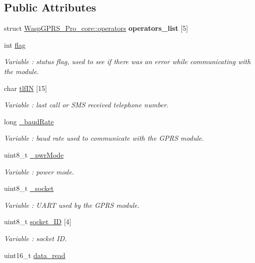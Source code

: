 \subsection*{Public Attributes}
\begin{DoxyCompactItemize}
\item 
struct \hyperlink{struct_wasp_g_p_r_s___pro__core_1_1operators}{Wasp\+G\+P\+R\+S\+\_\+\+Pro\+\_\+core\+::operators} {\bfseries operators\+\_\+list} \mbox{[}5\mbox{]}\hypertarget{class_wasp_g_p_r_s___pro__core_aeea2da99dc1753541bbfaded168fafad}{}\label{class_wasp_g_p_r_s___pro__core_aeea2da99dc1753541bbfaded168fafad}

\item 
int \hyperlink{class_wasp_g_p_r_s___pro__core_a39db9f922e8dca6aeef93010e42ae416}{flag}
\begin{DoxyCompactList}\small\item\em Variable \+: status flag, used to see if there was an error while communicating with the module. \end{DoxyCompactList}\item 
char \hyperlink{class_wasp_g_p_r_s___pro__core_a5c7dbd0508b7369149ff29723a56a925}{tlf\+IN} \mbox{[}15\mbox{]}
\begin{DoxyCompactList}\small\item\em Variable \+: last call or S\+MS received telephone number. \end{DoxyCompactList}\item 
long \hyperlink{class_wasp_g_p_r_s___pro__core_a3bb5ca4f32bfe890bc1fa14cc5751381}{\+\_\+baud\+Rate}
\begin{DoxyCompactList}\small\item\em Variable \+: baud rate used to communicate with the G\+P\+RS module. \end{DoxyCompactList}\item 
uint8\+\_\+t \hyperlink{class_wasp_g_p_r_s___pro__core_aba9ef2770a61f7e2114e5c84d4b25794}{\+\_\+pwr\+Mode}
\begin{DoxyCompactList}\small\item\em Variable \+: power mode. \end{DoxyCompactList}\item 
uint8\+\_\+t \hyperlink{class_wasp_g_p_r_s___pro__core_a88295f0945d2f69eef16e8ef71dbc0d1}{\+\_\+socket}
\begin{DoxyCompactList}\small\item\em Variable \+: U\+A\+RT used by the G\+P\+RS module. \end{DoxyCompactList}\item 
uint8\+\_\+t \hyperlink{class_wasp_g_p_r_s___pro__core_a3afa2569c7057708bcb718c5d14adec5}{socket\+\_\+\+ID} \mbox{[}4\mbox{]}
\begin{DoxyCompactList}\small\item\em Variable \+: socket ID. \end{DoxyCompactList}\item 
uint16\+\_\+t \hyperlink{class_wasp_g_p_r_s___pro__core_af3e0e2549b04b4372706b386d2eab3dc}{data\+\_\+read}\hypertarget{class_wasp_g_p_r_s___pro__core_af3e0e2549b04b4372706b386d2eab3dc}{}\label{class_wasp_g_p_r_s___pro__core_af3e0e2549b04b4372706b386d2eab3dc}


\end{DoxyCompactItemize}
